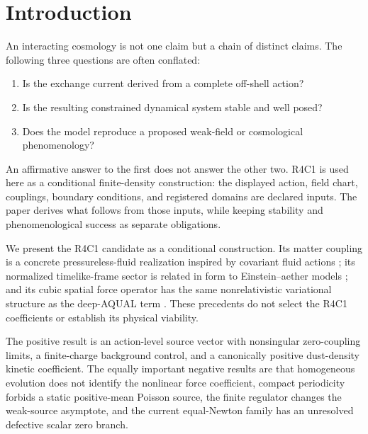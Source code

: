 \documentclass[aps,prd,reprint,superscriptaddress,nofootinbib,floatfix]{revtex4-2}
\begin{document}

\maketitle

\section{Introduction}
\label{sec:introduction}

An interacting cosmology is not one claim but a chain of distinct claims.  The
following three questions are often conflated:
\begin{enumerate}
\item Is the exchange current derived from a complete off-shell action?
\item Is the resulting constrained dynamical system stable and well posed?
\item Does the model reproduce a proposed weak-field or cosmological
phenomenology?
\end{enumerate}
An affirmative answer to the first does not answer the other two.  R4C1 is
used here as a conditional finite-density construction: the displayed action,
field chart, couplings, boundary conditions, and registered domains are
declared inputs.  The paper derives what follows from those inputs, while
keeping stability and phenomenological success as separate obligations.

We present the R4C1 candidate as a conditional construction.  Its matter
coupling is a concrete pressureless-fluid realization inspired by covariant
fluid actions \cite{brown1993}; its normalized timelike-frame sector is related
in form to Einstein--aether models \cite{jacobson2001}; and its cubic spatial
force operator has the same nonrelativistic variational structure as the
deep-AQUAL term \cite{bekenstein_milgrom}.  These precedents do not select the
R4C1 coefficients or establish its physical viability.

The positive result is an action-level source vector with nonsingular
zero-coupling limits, a finite-charge background control, and a canonically
positive dust-density kinetic coefficient.  The equally important negative
results are that homogeneous evolution does not identify the nonlinear force
coefficient, compact periodicity forbids a static positive-mean Poisson source,
the finite regulator changes the weak-source asymptote, and the current
equal-Newton family has an unresolved defective scalar zero branch.
\end{document}
